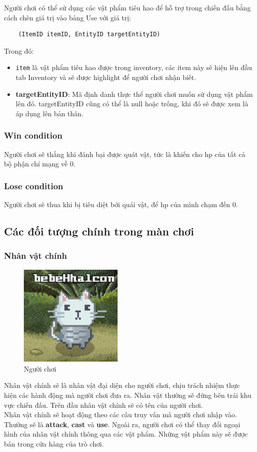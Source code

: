 Người chơi có thể sử dụng các vật phẩm tiêu hao để hỗ trợ trong chiến đấu bằng cách chèn giá trị vào bảng Use với giá trị:
\begin{verbatim}
	(ItemID itemID, EntityID targetEntityID)
\end{verbatim}
Trong đó:
\begin{itemize}
	\item  \texttt{item} là vật phẩm tiêu hao được trong inventory, các item này sẽ hiện lên đầu tab Inventory và sẽ được highlight để người chơi nhận biết.
	\item \textbf{targetEntityID}: Mã định danh thực thể người chơi muốn sử dụng vật phẩm lên đó. targetEntityID cũng có thể là null hoặc trống, khi đó sẽ được xem là áp dụng lên bản thân.
\end{itemize}

\subsubsection{Win condition}
Người chơi sẽ thắng khi đánh bại được quát vật, tức là khiến cho hp của tất cả bộ phận chí mạng về 0.
\subsubsection{Lose condition}
Người chơi sẽ thua khi bị tiêu diệt bởi quái vật, để hp của mình chạm đến 0.
\subsection{Các đối tượng chính trong màn chơi}
\subsubsection{Nhân vật chính}
\begin{figure}[H]
	\centering
	\includegraphics[width=5cm]{Images/Player.png}
	\vspace{0.5cm}
	\caption{Người chơi}
\end{figure}
\hspace*{0.5cm} Nhân vật chính sẽ là nhân vật đại diện cho người chơi, chịu trách nhiệm thực hiện các hành động mà người chơi đưa ra. Nhân vật thường sẽ đứng bên trái khu vực chiến đấu. Trên đầu nhân vật chính sẽ có tên của người chơi.\\
\hspace*{0.5cm} Nhân vật chính sẽ hoạt động theo các câu truy vấn mà người chơi nhập vào. Thường sẽ là \textbf{attack}, \textbf{cast} và \textbf{use}. Ngoài ra, người chơi có thể thay đổi ngoại hình của nhân vật chính thông qua các vật phẩm. Những vật phẩm này sẽ
được bán trong cửa hàng của trò chơi.
